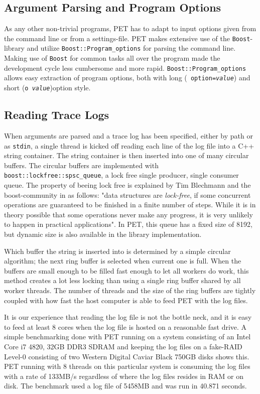 \subsection{Argument Parsing and Program Options}

As any other non-trivial programs, PET has to adapt to input options given from
the command line or from a settings-file. PET makes extensive use of the
\texttt{Boost}-library \cite{boostwebpage} and utilize
\texttt{Boost::Program\_options} for parsing the command line. Making use of
\texttt{Boost} for common tasks all over the program made the development cycle
less cumbersome and more rapid. \texttt{Boost::Program\_options} allows easy
extraction of program options, both with long (\texttt{\textemdash \textemdash
option=\emph{value}}) and short (\texttt{\textemdash o~\emph{value}})option
style.


\subsection{Reading Trace Logs}

When arguments are parsed and a trace log has been specified, either by path or
as \texttt{stdin}, a single thread is kicked off reading each line of the log
file into a C++ string container. The string container is then inserted into one
of many circular buffers. The circular buffers are implemented with
\texttt{boost::lockfree::spsc\_queue}, a lock free single producer, single
consumer queue. The property of beeing lock free is explained by Tim Blechmann
and the boost-community in \cite{boostlockfree} as follows: "data structures are
\emph{lock-free}, if some concurrent operations are guaranteed to be finished in a
finite number of steps. While it is in theory possible that some operations
never make any progress, it is very unlikely to happen in practical
applications". In PET, this queue has a fixed size of 8192, but dynamic size is
also available in the library implementation.

Which buffer the string is inserted into is determined by a simple circular
algorithm; the next ring buffer is selected when current one is full. When the
buffers are small enough to be filled fast enough to let all workers do work,
this method creates a lot less locking than using a single ring buffer shared by
all worker threads. The number of threads and the size of the ring buffers are
tightly coupled with how fast the host computer is able to feed PET with the log
files.

It is our experience that reading the log file is not the bottle neck, and it is
easy to feed at least 8 cores when the log file is hosted on a reasonable fast
drive. A simple benchmarking done with PET running on a system consisting of an
Intel Core i7 4820, 32GB DDR3 SDRAM and keeping the log files on a fake-RAID
Level-0 consisting of two Western Digital Caviar Black 750GB disks shows this.
PET running with 8 threads on this particular system is consuming the log files
with a rate of 133MB/s regardless of where the log files resides in RAM or on
disk. The benchmark used a log file of 5458MB and was run in 40.871 seconds.

